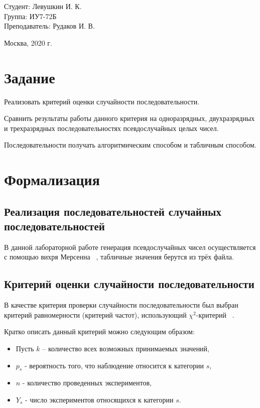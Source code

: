 \documentclass[a4paper,12pt]{article}
\begin{document}
	\large
	\begin{flushright}
		Студент: Левушкин И. К. \\
		Группа: ИУ7-72Б \\
		Преподаватель: Рудаков И. В. \\
	\end{flushright}
	
	\vspace*{25mm}
	\begin{center}
		Москва, 2020 г.  
	\end{center}
	\thispagestyle{empty}
	
	
	\newpage
	
	\section*{Задание}
	
	Реализовать критерий оценки случайности последовательности. 
	
	Сравнить результаты работы данного критерия на одноразрядных, двухразрядных и трехразрядных последовательностях псевдослучайных целых чисел.
	
	Последовательности получать алгоритмическим способом и табличным способом.
	
	\section*{Формализация}
	
	\subsection*{Реализация последовательностей случайных последовательностей}
	
	В данной лабораторной работе генерация псевдослучайных чисел осуществляется с помощью вихря Мерсенна ~\cite{mersen}, табличные значения берутся из трёх файла.
	
	\subsection*{Критерий оценки случайности последовательности}
	
	В качестве критерия проверки случайности последовательности был выбран критерий равномерности (критерий частот), использующий $\chi^2$-критерий ~\cite{knut}. 
	
	Кратко описать данный критерий можно следующим образом:
	
	\begin{itemize}
		\item Пусть $k$ – количество всех возможных принимаемых значений, 
		
		\item $p_s$ - вероятность того, что наблюдение относится к категории $s$,
		
		\item $n$ - количество проведенных экспериментов,
		
		\item $Y_s$ - число экспериментов относящихся к категории $s$.
	\end{itemize}
\end{document}
